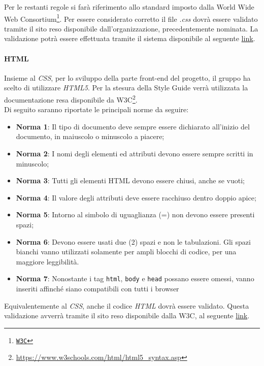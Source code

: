 Per le restanti regole si farà riferimento allo standard imposto dalla World Wide Web Consortium\footnote{\href{http://www.w3.org/}{\texttt{W3C}}}. Per essere considerato corretto il file \textit{.css} dovrà essere validato tramite il sito reso disponibile dall'organizzazione, precedentemente nominata. La validazione potrà essere effettuata tramite il sistema disponibile al seguente \href{http://validator.w3.org/}{link}.

\paragraph{HTML}
\label{html}

Insieme al \textit{CSS}, per lo sviluppo della parte front-end del progetto, il gruppo ha scelto di utilizzare \textit{HTML5}. Per la stesura della Style Guide verrà utilizzata la documentazione resa disponibile da W3C\footnote{\url{https://www.w3schools.com/html/html5_syntax.asp}}.\\

Di seguito saranno riportate le principali norme da seguire: \\
\begin{itemize}

\item \textbf{Norma 1}: 
Il tipo di documento deve sempre essere dichiarato all'inizio del documento, in maiuscolo o minuscolo a piacere;
\item \textbf{Norma 2}: 
I nomi degli elementi ed attributi devono essere sempre scritti in minuscolo;
\item \textbf{Norma 3}:
Tutti gli elementi HTML devono essere chiusi, anche se vuoti;
\item \textbf{Norma 4}:
Il valore degli attributi deve essere racchiuso dentro doppio apice;
\item \textbf{Norma 5}: 
Intorno al simbolo di uguaglianza (=) non devono essere presenti spazi;
\item \textbf{Norma 6}:
Devono essere usati due (2) spazi e non le tabulazioni. Gli spazi bianchi vanno utilizzati solamente per ampli blocchi di codice, per una maggiore leggibilità.
\item \textbf{Norma 7}:
Nonostante i tag \texttt{html}, 	\texttt{body} e \texttt{head} possano essere omessi, vanno inseriti affinché siano compatibili con tutti i browser
\end{itemize}

Equivalentemente al \textit{CSS}, anche il codice \textit{HTML} dovrà essere validato. Questa validazione avverrà tramite il sito reso disponibile dalla W3C, al seguente \href{https://validator.w3.org/}{link}.


